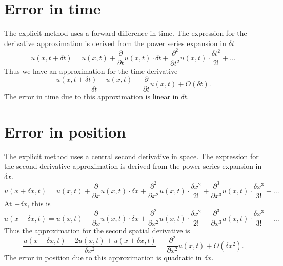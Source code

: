 \documentclass[letterpaper,titlepage,oneside]{report}
\begin{document}
\section*{Error in time}
The explicit method uses a forward difference in time. The
expression for the derivative approximation is derived from
the power series expansion in $\delta t$
\begin{equation}\label{eq:explicitexpansiondt}
  u(x,t+\delta t) = u(x,t) + \frac{\partial}{\partial t}u(x,t)\cdot\delta t
  + \frac{\partial^2}{\partial t^2}u(x,t)\cdot\frac{\delta t^2}{2!} + \dots
\end{equation}
Thus we have an approximation for the time derivative
\begin{equation}\label{eq:expliciterrdt}
  \frac{u(x,t+\delta t)-u(x,t)}{\delta t} = \frac{\partial}{\partial t}u(x,t)
  + O(\delta t).
\end{equation}
The error in time due to this approximation is linear in $\delta t$.

\section*{Error in position}
The explicit method uses a central second derivative in space. The
expression for the second derivative approximation is derived from
the power series expansion in $\delta x$.
\begin{equation}\label{eq:explicitexpansiondx}
  u(x+\delta x,t) = u(x,t) + \frac{\partial}{\partial x}u(x,t)\cdot\delta x +
  \frac{\partial^2}{\partial x^2}u(x,t)\cdot\frac{\delta x^2}{2!} +
  \frac{\partial^3}{\partial x^3}u(x,t)\cdot\frac{\delta x^3}{3!}
  + \dots
\end{equation}
At $-\delta x$, this is
\begin{equation*}
  u(x-\delta x,t) = u(x,t) - \frac{\partial}{\partial x}u(x,t)\cdot\delta x +
  \frac{\partial^2}{\partial x^2}u(x,t)\cdot\frac{\delta x^2}{2!} -
  \frac{\partial^3}{\partial x^3}u(x,t)\cdot\frac{\delta x^3}{3!}
  + \dots
\end{equation*}
Thus the approximation for the second spatial derivative is
\begin{equation}\label{eq:expliciterrdx}
  \frac{u(x-\delta x,t)-2u(x,t)+u(x+\delta x,t)}{\delta x^2} =
  \frac{\partial^2}{\partial x^2}u(x,t) + O(\delta x^2).
\end{equation}
The error in position due to this approximation is quadratic in $\delta x$.


\end{document}
